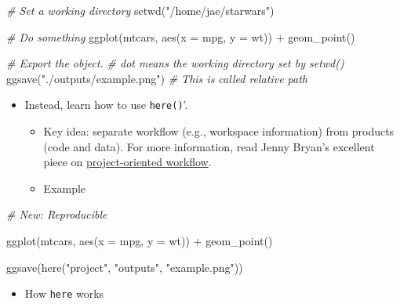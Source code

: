 \documentclass[
]{book}
\newenvironment{Shaded}{\begin{snugshade}}{\end{snugshade}}
\newcommand{\AttributeTok}[1]{\textcolor[rgb]{0.77,0.63,0.00}{#1}}
\newcommand{\CommentTok}[1]{\textcolor[rgb]{0.56,0.35,0.01}{\textit{#1}}}
\newcommand{\FunctionTok}[1]{\textcolor[rgb]{0.00,0.00,0.00}{#1}}
\newcommand{\NormalTok}[1]{#1}
\newcommand{\SpecialCharTok}[1]{\textcolor[rgb]{0.00,0.00,0.00}{#1}}
\newcommand{\StringTok}[1]{\textcolor[rgb]{0.31,0.60,0.02}{#1}}
\providecommand{\tightlist}{%
  \setlength{\itemsep}{0pt}\setlength{\parskip}{0pt}}
\begin{document}
\begin{Shaded}
\begin{Highlighting}[]
\CommentTok{\# Set a working directory }
\FunctionTok{setwd}\NormalTok{(}\StringTok{"/home/jae/starwars"}\NormalTok{)}

\CommentTok{\# Do something }
\FunctionTok{ggplot}\NormalTok{(mtcars, }\FunctionTok{aes}\NormalTok{(}\AttributeTok{x =}\NormalTok{ mpg, }\AttributeTok{y =}\NormalTok{ wt)) }\SpecialCharTok{+}
   \FunctionTok{geom\_point}\NormalTok{()}

\CommentTok{\# Export the object. }
\CommentTok{\# dot means the working directory set by setwd()}
\FunctionTok{ggsave}\NormalTok{(}\StringTok{"./outputs/example.png"}\NormalTok{) }\CommentTok{\# This is called relative path }
\end{Highlighting}
\end{Shaded}

\begin{itemize}
\item
  Instead, learn how to use \texttt{here()}'.

  \begin{itemize}
  \item
    Key idea: separate workflow (e.g., workspace information) from products (code and data). For more information, read Jenny Bryan's excellent piece on \href{https://www.tidyverse.org/blog/2017/12/workflow-vs-script/}{project-oriented workflow}.
  \item
    Example
  \end{itemize}
\end{itemize}

\begin{Shaded}
\begin{Highlighting}[]
\CommentTok{\# New: Reproducible }

\FunctionTok{ggplot}\NormalTok{(mtcars, }\FunctionTok{aes}\NormalTok{(}\AttributeTok{x =}\NormalTok{ mpg, }\AttributeTok{y =}\NormalTok{ wt)) }\SpecialCharTok{+}
   \FunctionTok{geom\_point}\NormalTok{()}

\FunctionTok{ggsave}\NormalTok{(}\FunctionTok{here}\NormalTok{(}\StringTok{"project"}\NormalTok{, }\StringTok{"outputs"}\NormalTok{, }\StringTok{"example.png"}\NormalTok{))}
\end{Highlighting}
\end{Shaded}

\begin{itemize}
\tightlist
\item
  How \texttt{here} works
\end{itemize}
\end{document}
